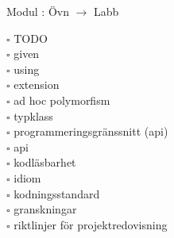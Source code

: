 
    Modul : Övn  $\rightarrow$ Labb 
    \begin{multicols}{3}\SlideFontTiny
    $\square$ TODO \\
$\square$ given \\
$\square$ using \\
$\square$ extension \\
$\square$ ad hoc polymorfism \\
$\square$ typklass \\
$\square$ programmeringsgränssnitt (api) \\
$\square$ api \\
$\square$ kodläsbarhet \\
$\square$ idiom \\
$\square$ kodningsstandard \\
$\square$ granskningar \\
$\square$ riktlinjer för projektredovisning \\
    \end{multicols}
    
